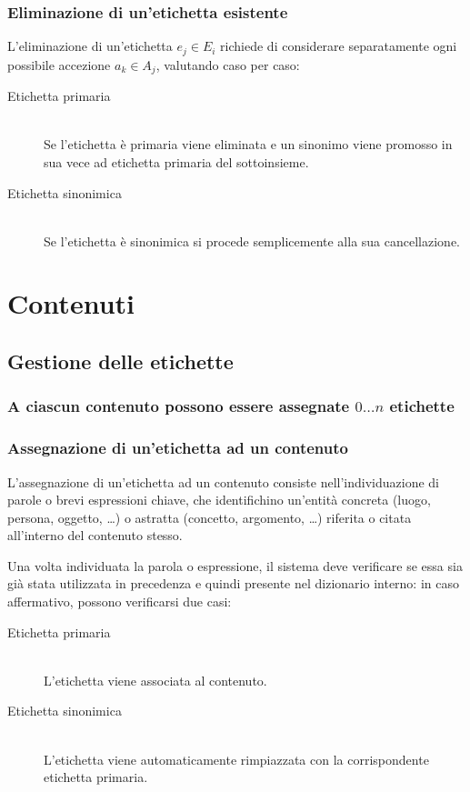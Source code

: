 \documentclass[10pt,a4paper,headinclude,footinclude,hidelinks]{scrreprt} %
\begin{document}
	\subsubsection{Eliminazione di un'etichetta esistente}
	L'eliminazione di un'etichetta $e_j \in E_i$ richiede di considerare separatamente ogni possibile accezione $a_k \in A_j$, valutando caso per caso:
	\begin{description}
	\item[Etichetta primaria]\hfill \\
	Se l'etichetta è primaria viene eliminata e un sinonimo viene promosso in sua vece ad etichetta primaria del sottoinsieme.
 	\item[Etichetta sinonimica] \hfill \\
	Se l'etichetta è sinonimica si procede semplicemente alla sua cancellazione.
	\end{description}

	\section{Contenuti} %
	
	\subsection{Gestione delle etichette}
	\subsubsection{A ciascun contenuto possono essere assegnate $0\ldots n$ etichette}
	\subsubsection{Assegnazione di un'etichetta ad un contenuto}
	L'assegnazione di un'etichetta ad un contenuto consiste nell'individuazione di parole o brevi espressioni chiave, che identifichino un'entità concreta (luogo, persona, oggetto, \ldots) o astratta (concetto, argomento, \ldots) riferita o citata all'interno del contenuto stesso.
	
	Una volta individuata la parola o espressione, il sistema deve verificare se essa sia già stata utilizzata in precedenza e quindi presente nel dizionario interno: in caso affermativo, possono verificarsi due casi:
	\begin{description}
	\item[Etichetta primaria] \hfill \\
	L'etichetta viene associata al contenuto.
	\item[Etichetta sinonimica] \hfill \\
	L'etichetta viene automaticamente rimpiazzata con la corrispondente etichetta primaria.
	\end{description}
\end{document}
